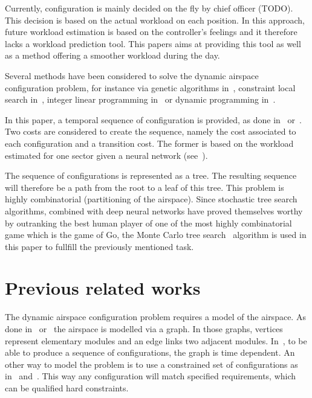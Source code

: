 \documentclass[oneside,twocolumn]{article}
\begin{document}
Currently, configuration is mainly decided on the fly by chief officer (TODO).
This decision is based on the actual workload on each position. In this
approach, future workload estimation is based on the controller's feelings and
it therefore lacks a workload prediction tool.
This papers aims at providing this tool as well as a method offering a smoother
workload during the day.

Several methods have been considered to solve the dynamic airspace configuration
problem, for instance via genetic algorithms in~\cite{sergeeva2017dynamic},
constraint local search in~\cite{jagare2013airspace}, integer linear
programming in~\cite{treimuth2016branch} or dynamic programming
in~\cite{bloem2010dynamic}.

In this paper, a temporal sequence of configuration is provided, as done
in~\cite{treimuth2016branch} or~\cite{sergeeva2017dynamic}.
Two costs are considered to create the sequence, namely the cost
associated to each configuration and a transition cost. The former is based on
the workload estimated for one sector given a neural network
(see~\cite{gianazza2010forecasting}).

The sequence of configurations is represented as a tree. The resulting
sequence will therefore be a path from the root to a leaf of this tree. This
problem is highly combinatorial (partitioning of the airspace). Since stochastic
tree search algorithms, combined with deep neural networks have proved
themselves worthy by outranking the best human player of one of the most highly
combinatorial game which is the game of Go, the Monte Carlo tree
search~\cite{browne2012survey} algorithm is used in this paper to fullfill the
previously mentioned task.



\section{Previous related works}\label{sec:previous_related_works}

The dynamic airspace configuration problem requires a model of the airspace. As
done in~\cite{sergeeva2017dynamic} or~\cite{treimuth2016branch} the airspace
is modelled via a graph. In those graphs, vertices represent elementary modules
and an edge links two adjacent modules. In~\cite{treimuth2016branch}, to be
able to produce a sequence of configurations, the graph is time dependent.
An other way to model the problem is to use a constrained set of
configurations as in~\cite{gianazza2010forecasting} and~\cite{bloem2010dynamic}.
This way any configuration will match specified requirements, which can be
qualified hard constraints.
\end{document}
